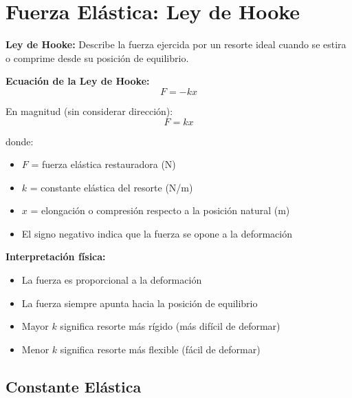 \newpage
\section{Fuerza Elástica: Ley de Hooke}

\begin{seccion}

\begin{defincion}
    \textbf{Ley de Hooke:} Describe la fuerza ejercida por un resorte ideal cuando se estira o comprime desde su posición de equilibrio.
\end{defincion}

\begin{ecuacion}
\textbf{Ecuación de la Ley de Hooke:}
$$F = -kx$$

En magnitud (sin considerar dirección):
$$F = kx$$

donde:
\begin{itemize}
    \item $F$ = fuerza elástica restauradora (N)
    \item $k$ = constante elástica del resorte (N/m)
    \item $x$ = elongación o compresión respecto a la posición natural (m)
    \item El signo negativo indica que la fuerza se opone a la deformación
\end{itemize}
\end{ecuacion}

\textbf{Interpretación física:}
\begin{itemize}
    \item La fuerza es proporcional a la deformación
    \item La fuerza siempre apunta hacia la posición de equilibrio
    \item Mayor $k$ significa resorte más rígido (más difícil de deformar)
    \item Menor $k$ significa resorte más flexible (fácil de deformar)
\end{itemize}
\end{seccion}

\subsection{Constante Elástica}

